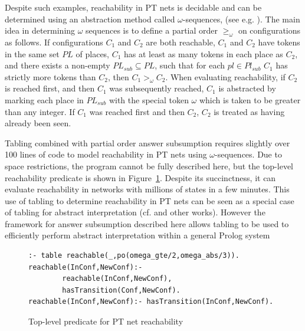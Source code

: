 Despite such examples, reachability in PT nets is decidable and can be
determined using an abstraction method called $\omega$-sequences, (see
e.g. \cite{DesR98}).  The main idea in determining $\omega$ sequences
is to define a partial order $\geq_{\omega}$ on configurations as
follows.  If configurations $C_1$ and $C_2$ are both reachable, $C_1$
and $C_2$ have tokens in the same set $PL$ of places, $C_1$ has at
least as many tokens in each place as $C_2$, and there exists a
non-empty $PL_{sub} \subseteq PL$, such that for each $pl \in
Pl_{sub}$ $C_1$ has strictly more tokens than $C_2$, then $C_1
>_{\omega} C_2$.  When evaluating reachability, if $C_2$ is reached
first, and then $C_1$ was subsequently reached, $C_1$ is abstracted by
marking each place in $PL_{sub}$ with the special token $\omega$ which
is taken to be greater than any integer.  If $C_1$ was reached first
and then $C_2$, $C_2$ is treated as having already been seen.

Tabling combined with partial order answer subsumption requires
slightly over 100 lines of code to model reachability in PT nets using
$\omega$-sequences.  Due to space restrictions, the program cannot be
fully described here, but the top-level reachability predicate is
shown in Figure~\ref{fig:ptnetcode}.  Despite its succinctness, it can
evaluate reachability in networks with millions of states in a few
minutes.  This use of tabling to determine reachability in PT nets can
be seen as a special case of tabling for abstract interpretation
(cf. \cite{KaKa93} and other works).  However the framework for answer
subsumption described here allows tabling to be used to efficiently
perform abstract interpretation within a general Prolog system
%
\begin{figure}
\begin{verbatim}
:- table reachable(_,po(omega_gte/2,omega_abs/3)).
reachable(InConf,NewConf):-
        reachable(InConf,NewConf),
        hasTransition(Conf,NewConf).
reachable(InConf,NewConf):- hasTransition(InConf,NewConf).
\end{verbatim}
\caption{Top-level predicate for PT net reachability}
\label{fig:ptnetcode}
\end{figure}

